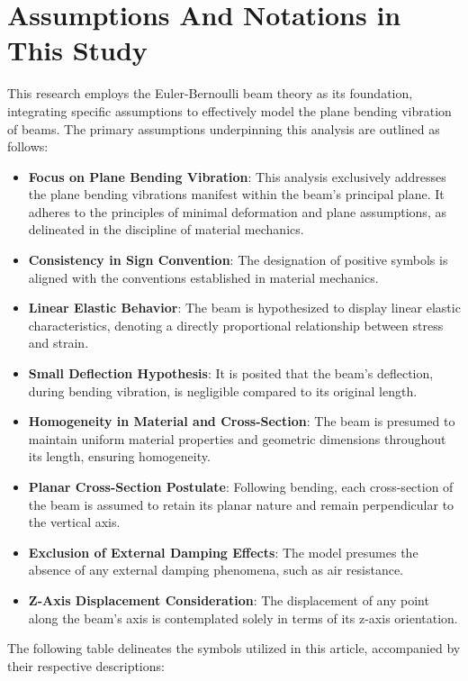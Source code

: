 \documentclass[conference]{IEEEtran}
\begin{document}
\section{Assumptions And Notations in This Study}

This research employs the Euler-Bernoulli beam theory as its foundation, integrating specific assumptions to effectively model the plane bending vibration of beams. The primary assumptions underpinning this analysis are outlined as follows:

\begin{itemize}
    \item \textbf{Focus on Plane Bending Vibration}: This analysis exclusively addresses the plane bending vibrations manifest within the beam's principal plane. It adheres to the principles of minimal deformation and plane assumptions, as delineated in the discipline of material mechanics.
    \item \textbf{Consistency in Sign Convention}: The designation of positive symbols is aligned with the conventions established in material mechanics.
    \item \textbf{Linear Elastic Behavior}: The beam is hypothesized to display linear elastic characteristics, denoting a directly proportional relationship between stress and strain.
    \item \textbf{Small Deflection Hypothesis}: It is posited that the beam's deflection, during bending vibration, is negligible compared to its original length.
    \item \textbf{Homogeneity in Material and Cross-Section}: The beam is presumed to maintain uniform material properties and geometric dimensions throughout its length, ensuring homogeneity.
    \item \textbf{Planar Cross-Section Postulate}: Following bending, each cross-section of the beam is assumed to retain its planar nature and remain perpendicular to the vertical axis.
    \item \textbf{Exclusion of External Damping Effects}: The model presumes the absence of any external damping phenomena, such as air resistance.
    \item \textbf{Z-Axis Displacement Consideration}: The displacement of any point along the beam's axis is contemplated solely in terms of its z-axis orientation.
\end{itemize}

The following table delineates the symbols utilized in this article, accompanied by their respective descriptions:
\end{document}
